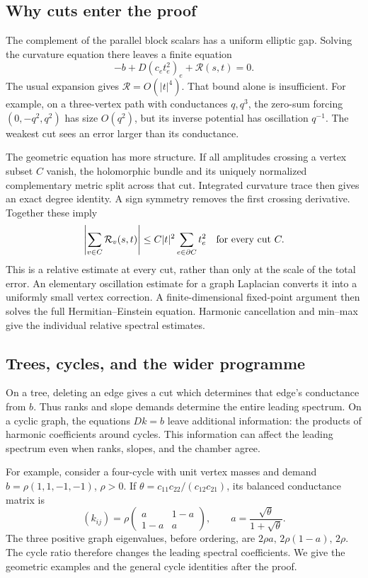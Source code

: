 \documentclass[11pt]{amsart}
\theoremstyle{definition}
\theoremstyle{remark}
\newcommand{\cR}{\mathcal R}
\begin{document}
\subsection{Why cuts enter the proof}

The complement of the parallel block scalars has a uniform
elliptic gap. Solving the curvature equation there leaves a
finite equation
\begin{equation}\label{eq01:reducedpreview}
 -b+D(c_et_e^2)_e+\cR(s,t)=0.
\end{equation}
The usual expansion gives \(\cR=O(|t|^4)\). That bound alone is
insufficient. For example, on a three-vertex path with conductances
\(q,q^3\), the zero-sum forcing \((0,-q^2,q^2)\) has size
\(O(q^2)\), but its inverse potential has oscillation \(q^{-1}\).
The weakest cut sees an error larger than its conductance.

The geometric equation has more structure. If all amplitudes crossing
a vertex subset \(C\) vanish, the holomorphic bundle and its uniquely
normalized complementary metric split across that cut. Integrated
curvature trace then gives an exact degree identity. A sign symmetry
removes the first crossing derivative. Together these imply
\begin{equation}\label{eq01:cutpreview}
 \left|\sum_{v\in C}\cR_v(s,t)\right|
 \leq C|t|^2\sum_{e\in\partial C}t_e^2
 \quad\hbox{for every cut }C.
\end{equation}
This is a relative estimate at every cut, rather than only at the
scale of the total error. An elementary oscillation estimate for a
graph Laplacian converts it into a uniformly small vertex
correction. A finite-dimensional fixed-point argument then solves
the full Hermitian--Einstein equation. Harmonic cancellation and
min--max give the individual relative spectral estimates.

\subsection{Trees, cycles, and the wider programme}

On a tree, deleting an edge gives a cut which determines that edge's
conductance from \(b\). Thus ranks and slope demands determine the
entire leading spectrum. On a cyclic graph, the equations \(Dk=b\)
leave additional information: the products of harmonic coefficients
around cycles. This information can affect the leading spectrum
even when ranks, slopes, and the chamber agree.

For example, consider a four-cycle with unit vertex masses and
demand \(b=\rho(1,1,-1,-1)\), \(\rho>0\). If
\(\theta=c_{11}c_{22}/(c_{12}c_{21})\), its balanced conductance
matrix is
\[
 (k_{ij})=\rho
 \begin{pmatrix}a&1-a\\1-a&a\end{pmatrix},
 \qquad a=\frac{\sqrt\theta}{1+\sqrt\theta}.
\]
The three positive graph eigenvalues, before ordering, are
\(2\rho a,\,2\rho(1-a),\,2\rho\).
The cycle ratio therefore changes the leading spectral coefficients.
We give the geometric examples and the general cycle identities
after the proof.
\end{document}
